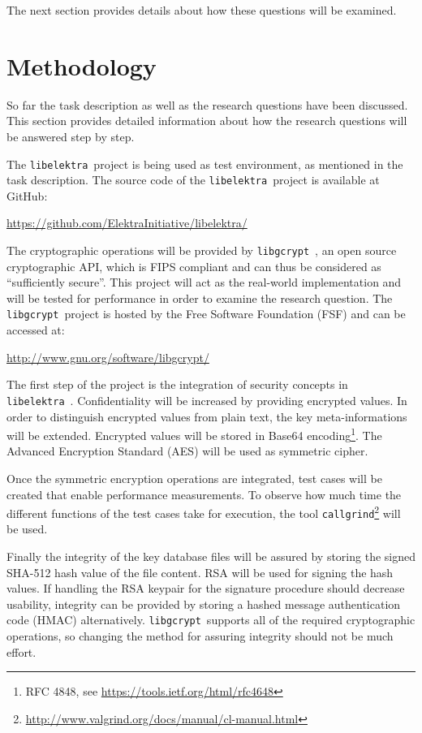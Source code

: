 \documentclass[a4paper,12pt]{article}
\newcommand{\libelektra}{\texttt{libelektra}~}
\newcommand{\libgcrypt}{\texttt{libgcrypt}~}
\begin{document}
The next section provides details about how these questions will be examined.


\section{Methodology}

So far the task description as well as the research questions have been discussed.
This section provides detailed information about how the research questions will be answered step by step.

The \libelektra project is being used as test environment, as mentioned in the task description.
The source code of the \libelektra project is available at GitHub:

\url{https://github.com/ElektraInitiative/libelektra/}

The cryptographic operations will be provided by \libgcrypt, an open source cryptographic API, which is FIPS compliant and can thus be considered as ``sufficiently secure''.
This project will act as the real-world implementation and will be tested for performance in order to examine the research question.
The \libgcrypt project is hosted by the Free Software Foundation (FSF) and can be accessed at:

\url{http://www.gnu.org/software/libgcrypt/}

The first step of the project is the integration of security concepts in \libelektra. 
Confidentiality will be increased by providing encrypted values. 
In order to distinguish encrypted values from plain text, the key meta-informations will be extended. 
Encrypted values will be stored in Base64 encoding\footnote{RFC 4848, see \url{https://tools.ietf.org/html/rfc4648}}.
The Advanced Encryption Standard (AES) will be used as symmetric cipher.

Once the symmetric encryption operations are integrated, test cases will be created that enable performance measurements.
To observe how much time the different functions of the test cases take for execution, the tool \texttt{callgrind}\footnote{\url{http://www.valgrind.org/docs/manual/cl-manual.html}} will be used.

Finally the integrity of the key database files will be assured by storing the signed SHA-512 hash value of the file content. 
RSA will be used for signing the hash values. 
If handling the RSA keypair for the signature procedure should decrease usability, integrity can be provided by storing a hashed message authentication code (HMAC) alternatively.
\libgcrypt supports all of the required cryptographic operations, so changing the method for assuring integrity should not be much effort.
\end{document}
